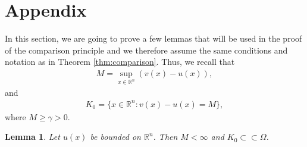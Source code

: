 \documentclass[11pt]{article}
\providecommand{\Rn}{\mathbb{R}^n}
\newtheorem{lem}[thm]{Lemma}
\numberwithin{equation}{section}
\theoremstyle{definition}
\begin{document}
\appendix
\section{Appendix}
In this section, we are going to prove a few lemmas that will be used in the proof of the comparison principle and we therefore assume the same conditions and notation as in Theorem \ref{thm:comparison}. Thus, we recall that
\begin{align*}
    M = \sup_{x \in \Rn} (v(x)-u(x)),
\end{align*}
and
\begin{align*}
    K_0 = \{x \in \Rn:v(x)-u(x) = M \},
\end{align*}
where $ M \geq \gamma > 0$.
\begin{lem}
\label{lem:A1}
    Let $u(x)$ be bounded on $ \Rn$.
Then $M < \infty$ and $K_0 \subset \subset \Omega$.
\end{lem}
\end{document}
